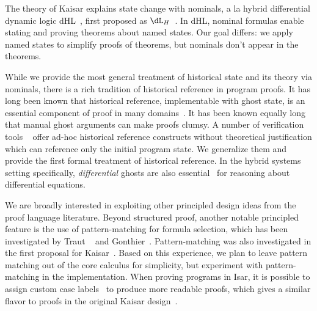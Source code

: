 \documentclass[12pt]{cmuthesis}
\theoremstyle{definition}
\theoremstyle{remark}
\newcommand{\dLN}{\ensuremath{\dL_H}}
\newcommand{\dHL}{\textsf{dHL}\xspace}
\begin{document}
The theory of Kaisar explains state change with nominals, a la hybrid differential dynamic logic \dHL~\cite{DBLP:conf/lics/BohrerP18}, first proposed as \dLN~\cite{DBLP:journals/entcs/Platzer07}.
In \dHL, nominal formulas enable stating and proving theorems about named states.
Our goal differs: we apply named states to simplify proofs of theorems, but nominals don't appear in the theorems.

While we provide the most general treatment of historical state and its theory via nominals, there is a rich tradition of historical reference in program proofs.
It has long been known that historical reference, implementable with ghost state, is an essential component of proof in many domains~\cite{DBLP:journals/tcs/AptBM79,Owicki1976,DBLP:books/garland/Owicki75,apt2010verification,DBLP:journals/acta/Clint73}.
It has been known equally long~\cite{DBLP:journals/acta/Clarke80} that manual ghost arguments can make proofs clumsy.
A number of verification tools ~\cite{KeYBook,DBLP:conf/cade/FultonMQVP15,DBLP:conf/lpar/Leino10,this-is-boogie-2-2,Barnett2005,DBLP:conf/fosad/LeinoMS09,DBLP:books/daglib/p/LeavensBR99,DBLP:journals/fac/Kleymann99} offer ad-hoc historical reference constructs without theoretical justification which can reference only the initial program state.
We generalize them and provide the first formal treatment of historical reference.
In the hybrid systems setting specifically, \emph{differential} ghosts are also essential~\cite{DBLP:conf/lics/PlatzerT18} for reasoning about differential equations.


We are broadly interested in exploiting other principled design ideas from the proof language literature.
Beyond structured proof, another notable principled feature is the use of pattern-matching for formula selection, which has been investigated by Traut ~\cite{traut2014pattern} and Gonthier~\cite{DBLP:conf/itp/GonthierT12}.
Pattern-matching was also investigated in the first proposal for Kaisar~\cite{DBLP:journals/corr/abs-1908-05535}.
Based on this experience, we plan to leave pattern matching out of the core calculus for simplicity, but experiment with pattern-matching in the implementation.
When proving programs in Isar, it is possible to assign custom case labels~\cite{DBLP:journals/afp/Noschinski15} to produce more readable proofs, which gives a similar flavor to proofs in the original Kaisar design~\cite{DBLP:journals/corr/abs-1908-05535}.
\end{document}
